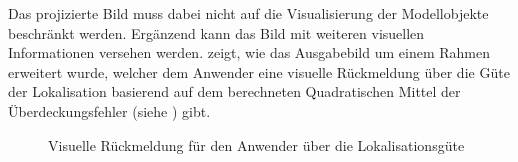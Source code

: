 Das projizierte Bild muss dabei nicht auf die Visualisierung der Modellobjekte beschränkt werden. Ergänzend kann das Bild mit weiteren visuellen Informationen versehen werden.  zeigt, wie das Ausgabebild um einem Rahmen erweitert wurde, welcher dem Anwender eine visuelle Rückmeldung über die Güte der Lokalisation basierend auf dem berechneten Quadratischen Mittel der Überdeckungsfehler (siehe ) gibt.\\

\prever{
}

\begin{figure}[!ht]
	\begin{center}
	\hspace{5mm}
	\caption{Visuelle Rückmeldung für den Anwender über die Lokalisationsgüte}
	\label{fig.proj_rms}
	\end{center}
\end{figure}

\prever{
}